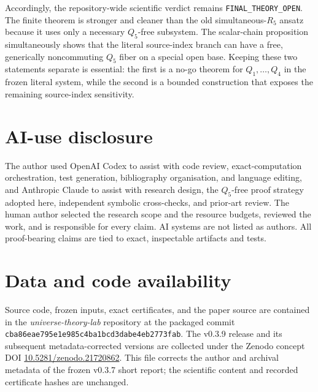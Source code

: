\documentclass[11pt]{article}
\theoremstyle{remark}
\theoremstyle{plain}
\newcommand{\artifact}[1]{\texttt{\small #1}}
\begin{document}
Accordingly, the repository-wide scientific verdict remains
\artifact{FINAL\_THEORY\_OPEN}.  The finite theorem is stronger and cleaner
than the old simultaneous-\(R_5\) ansatz because it uses only a necessary
\(Q_5\)-free subsystem.  The scalar-chain proposition simultaneously shows
that the literal source-index branch can have a free, generically
noncommuting \(Q_5\) fiber on a special open base.  Keeping these two
statements separate is essential: the first is a no-go theorem for
\(Q_1,\ldots,Q_4\) in the frozen literal system, while the second is a
bounded construction that exposes the remaining source-index sensitivity.

\section*{AI-use disclosure}

The author used OpenAI Codex to assist with code review, exact-computation
orchestration, test generation, bibliography organisation, and language
editing, and Anthropic Claude to assist with research design, the
\(Q_5\)-free proof strategy adopted here, independent symbolic
cross-checks, and prior-art review.  The human author selected the research
scope and the resource budgets, reviewed the work, and is responsible for
every claim.  AI systems are not listed as authors.  All proof-bearing
claims are tied to exact, inspectable artifacts and tests.

\section*{Data and code availability}

Source code, frozen inputs, exact certificates, and the paper source are
contained in the \emph{universe-theory-lab} repository at the packaged
commit \artifact{cba86eae795e1e985c4ba1bcd3dabe4eb2773fab}.  The v0.3.9
release and its subsequent metadata-corrected versions are collected under
the Zenodo concept DOI
\href{https://doi.org/10.5281/zenodo.21720862}{10.5281/zenodo.21720862}.
This file corrects the author and archival metadata of the frozen v0.3.7
short report; the scientific content and recorded certificate hashes are
unchanged.



\end{document}

